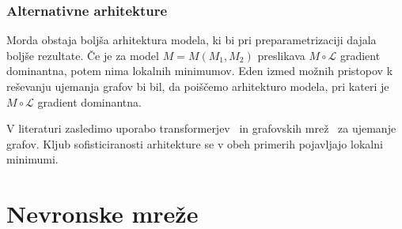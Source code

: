 \documentclass[mat2, tisk]{fmfdelo}
\newcommand{\R}{\mathbb R}
\newcommand{\loss}{\mathcal L}
\begin{document}
\subsubsection{Alternativne arhitekture}
Morda obstaja boljša arhitektura modela, ki bi pri preparametrizaciji
dajala boljše rezultate. Če je za model $M=M(M_1, M_2)$ preslikava
$M \circ \loss$ gradient dominantna, potem nima lokalnih minimumov. Eden izmed
možnih pristopov k reševanju ujemanja grafov bi bil, da poiščemo
arhitekturo modela, pri kateri je $M \circ \loss$ gradient dominantna.

V literaturi zasledimo uporabo transformerjev~\cite{LIU2023109059} in
grafovskih mrež~\cite{graphoptimaltransport2020crossdomainalignment}
za ujemanje grafov. Kljub sofisticiranosti arhitekture
se v obeh primerih pojavljajo lokalni minimumi.
\appendix
\clearpage
\section{Nevronske mreže}
\label{poglavje:konvergenca-globokih-mrez}
\label{section:overparametrisation}
%
\label{poglavje:nn}
\end{document}
